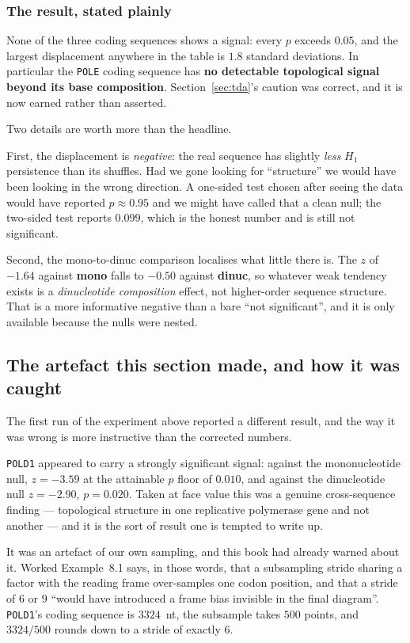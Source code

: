 \subsubsection*{The result, stated plainly}

None of the three coding sequences shows a signal: every $p$ exceeds $0.05$, and
the largest displacement anywhere in the table is $1.8$ standard deviations. In
particular the \texttt{POLE} coding sequence has \textbf{no detectable topological signal
beyond its base composition}. Section~\ref{sec:tda}'s caution was correct, and
it is now earned rather than asserted.

Two details are worth more than the headline.

First, the displacement is \emph{negative}: the real sequence has slightly
\emph{less} $H_1$ persistence than its shuffles. Had we gone looking for
``structure'' we would have been looking in the wrong direction. A one-sided test
chosen after seeing the data would have reported $p \approx 0.95$ and we might
have called that a clean null; the two-sided test reports $0.099$, which is the
honest number and is still not significant.

Second, the mono-to-dinuc comparison localises what little there is. The $z$ of
$-1.64$ against \textbf{mono} falls to $-0.50$ against \textbf{dinuc}, so
whatever weak tendency exists is a \emph{dinucleotide composition} effect, not
higher-order sequence structure. That is a more informative negative than a bare
``not significant'', and it is only available because the nulls were nested.

\subsection{The artefact this section made, and how it was caught}\label{sub:strideartefact}

The first run of the experiment above reported a different result, and the way it
was wrong is more instructive than the corrected numbers.

\texttt{POLD1} appeared to carry a strongly significant signal: against the
mononucleotide null, $z = -3.59$ at the attainable $p$ floor of $0.010$, and
against the dinucleotide null $z = -2.90$, $p = 0.020$. Taken at face value this
was a genuine cross-sequence finding --- topological structure in one replicative
polymerase gene and not another --- and it is the sort of result one is tempted
to write up.

It was an artefact of our own sampling, and this book had already warned about
it. Worked Example~8.1 says, in those words, that a subsampling stride sharing a
factor with the reading frame over-samples one codon position, and that a stride
of $6$ or $9$ ``would have introduced a frame bias invisible in the final
diagram''. \texttt{POLD1}'s coding sequence is $3324$~nt, the subsample takes
$500$ points, and $3324 / 500$ rounds down to a stride of exactly $6$.

